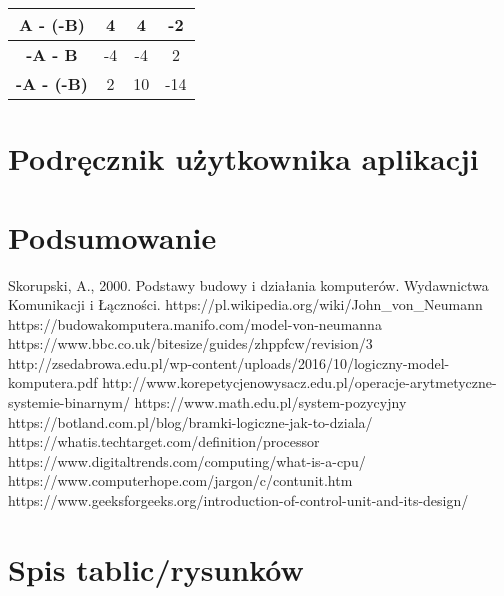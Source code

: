 \documentclass[12pt, a4paper, onside, polish]{article}				%
\begin{document}
\begin{table}[hbt!]
\begin{tabular}{|c|ccc|}
\cellcolor[HTML]{EFEFEF}\textbf{A - (-B)}  & \multicolumn{1}{c|}{\cellcolor[HTML]{32CB00}4}                     & \multicolumn{1}{c|}{\cellcolor[HTML]{32CB00}4}                      & -2                                             \\ \hline
\rowcolor[HTML]{32CB00} 
\cellcolor[HTML]{EFEFEF}\textbf{-A - B}    & \multicolumn{1}{c|}{\cellcolor[HTML]{32CB00}-4}                    & \multicolumn{1}{c|}{\cellcolor[HTML]{32CB00}-4}                     & 2                                              \\ \hline
\rowcolor[HTML]{32CB00} 
\cellcolor[HTML]{EFEFEF}\textbf{-A - (-B)} & \multicolumn{1}{c|}{\cellcolor[HTML]{32CB00}2}                     & \multicolumn{1}{c|}{\cellcolor[HTML]{32CB00}10}                     & -14                                            \\ \hline
\end{tabular}
\end{table}
\cleardoublepage



\section{Podręcznik użytkownika aplikacji}
\cleardoublepage




\section{Podsumowanie}
\cleardoublepage



\begin{thebibliography}{100}
 Skorupski, A., 2000. Podstawy budowy i działania komputerów. Wydawnictwa Komunikacji i Łączności.
\bibitem{} https://pl.wikipedia.org/wiki/John_von_Neumann 
\bibitem{} https://budowakomputera.manifo.com/model-von-neumanna 
\bibitem{} https://www.bbc.co.uk/bitesize/guides/zhppfcw/revision/3 
\bibitem{} http://zsedabrowa.edu.pl/wp-content/uploads/2016/10/logiczny-model-komputera.pdf 
\bibitem{} http://www.korepetycjenowysacz.edu.pl/operacje-arytmetyczne-systemie-binarnym/
\bibitem{} https://www.math.edu.pl/system-pozycyjny
\bibitem{} https://botland.com.pl/blog/bramki-logiczne-jak-to-dziala/
\bibitem{} https://whatis.techtarget.com/definition/processor
\bibitem{} https://www.digitaltrends.com/computing/what-is-a-cpu/
\bibitem{} https://www.computerhope.com/jargon/c/contunit.htm
\bibitem{} https://www.geeksforgeeks.org/introduction-of-control-unit-and-its-design/

\end{thebibliography}


\cleardoublepage
\section{Spis tablic/rysunków}
\begin{appendix}
\listoftables
\listoffigures
\end{appendix}

\cleardoublepage
\end{document}
